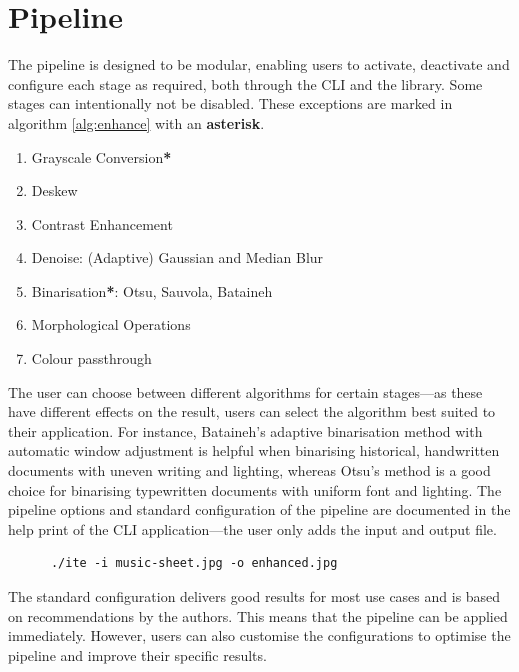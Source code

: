 \documentclass[sigconf]{acmart}
\begin{document}
\section{Pipeline}
\label{sec:pipeline}
  
The pipeline is designed to be modular, enabling users to activate, deactivate and configure each stage as required, both through the CLI and the library. Some stages can intentionally not be disabled. These exceptions are marked in algorithm \ref{alg:enhance} with an \textbf{asterisk}. 

\begin{algorithm}
  \caption{Image Text Enhancer Pipeline}
  \label{alg:enhance}
  \begin{enumerate}
  \item Grayscale Conversion\textbf{*}
  \item Deskew
  \item Contrast Enhancement
  \item Denoise: (Adaptive) Gaussian and Median Blur
  \item Binarisation\textbf{*}: Otsu, Sauvola, Bataineh
  \item Morphological Operations
  \item Colour passthrough
\end{enumerate}
\end{algorithm}

The user can choose between different algorithms for certain stages---as these have different effects on the result, users can select the algorithm best suited to their application. For instance, Bataineh's adaptive binarisation method with automatic window adjustment \cite{adaptive_thresholding_methods_bataineh_2011} is helpful when binarising historical, handwritten documents with uneven writing and lighting, whereas Otsu's method \cite{Otsu1979} is a good choice for binarising typewritten documents with uniform font and lighting.
The pipeline options and standard configuration of the pipeline are documented in the help print of the CLI application---the user only adds the input and output file.
\begin{verbatim}
      ./ite -i music-sheet.jpg -o enhanced.jpg
\end{verbatim}
The standard configuration delivers good results for most use cases and is based on recommendations by the authors. This means that the pipeline can be applied immediately. However, users can also customise the configurations to optimise the pipeline and improve their specific results.
\end{document}
